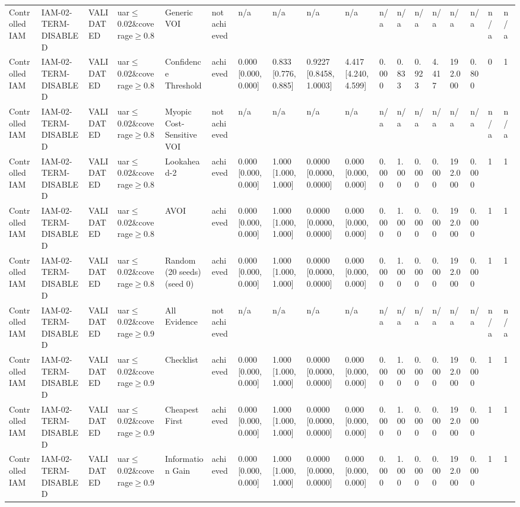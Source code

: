 \begin{table}[!ht]
{\begin{tabular}{llllllllllllllllll}
Controlled IAM & IAM-02-TERM-DISABLED & VALIDATED & uar$\le$0.02\&coverage$\ge$0.8 & Generic VOI & not achieved & n/a & n/a & n/a & n/a & n/a & n/a & n/a & n/a & n/a & n/a & n/a & n/a \\
Controlled IAM & IAM-02-TERM-DISABLED & VALIDATED & uar$\le$0.02\&coverage$\ge$0.8 & Confidence Threshold & achieved & 0.000 [0.000, 0.000] & 0.833 [0.776, 0.885] & 0.9227 [0.8458, 1.0003] & 4.417 [4.240, 4.599] & 0.000 & 0.833 & 0.923 & 4.417 & 192.000 & 0.800 & 0 & 1 \\
Controlled IAM & IAM-02-TERM-DISABLED & VALIDATED & uar$\le$0.02\&coverage$\ge$0.8 & Myopic Cost-Sensitive VOI & not achieved & n/a & n/a & n/a & n/a & n/a & n/a & n/a & n/a & n/a & n/a & n/a & n/a \\
Controlled IAM & IAM-02-TERM-DISABLED & VALIDATED & uar$\le$0.02\&coverage$\ge$0.8 & Lookahead-2 & achieved & 0.000 [0.000, 0.000] & 1.000 [1.000, 1.000] & 0.0000 [0.0000, 0.0000] & 0.000 [0.000, 0.000] & 0.000 & 1.000 & 0.000 & 0.000 & 192.000 & 0.000 & 1 & 1 \\
Controlled IAM & IAM-02-TERM-DISABLED & VALIDATED & uar$\le$0.02\&coverage$\ge$0.8 & AVOI & achieved & 0.000 [0.000, 0.000] & 1.000 [1.000, 1.000] & 0.0000 [0.0000, 0.0000] & 0.000 [0.000, 0.000] & 0.000 & 1.000 & 0.000 & 0.000 & 192.000 & 0.000 & 1 & 1 \\
Controlled IAM & IAM-02-TERM-DISABLED & VALIDATED & uar$\le$0.02\&coverage$\ge$0.8 & Random (20 seeds) (seed 0) & achieved & 0.000 [0.000, 0.000] & 1.000 [1.000, 1.000] & 0.0000 [0.0000, 0.0000] & 0.000 [0.000, 0.000] & 0.000 & 1.000 & 0.000 & 0.000 & 192.000 & 0.000 & 1 & 1 \\
Controlled IAM & IAM-02-TERM-DISABLED & VALIDATED & uar$\le$0.02\&coverage$\ge$0.9 & All Evidence & not achieved & n/a & n/a & n/a & n/a & n/a & n/a & n/a & n/a & n/a & n/a & n/a & n/a \\
Controlled IAM & IAM-02-TERM-DISABLED & VALIDATED & uar$\le$0.02\&coverage$\ge$0.9 & Checklist & achieved & 0.000 [0.000, 0.000] & 1.000 [1.000, 1.000] & 0.0000 [0.0000, 0.0000] & 0.000 [0.000, 0.000] & 0.000 & 1.000 & 0.000 & 0.000 & 192.000 & 0.000 & 1 & 1 \\
Controlled IAM & IAM-02-TERM-DISABLED & VALIDATED & uar$\le$0.02\&coverage$\ge$0.9 & Cheapest First & achieved & 0.000 [0.000, 0.000] & 1.000 [1.000, 1.000] & 0.0000 [0.0000, 0.0000] & 0.000 [0.000, 0.000] & 0.000 & 1.000 & 0.000 & 0.000 & 192.000 & 0.000 & 1 & 1 \\
Controlled IAM & IAM-02-TERM-DISABLED & VALIDATED & uar$\le$0.02\&coverage$\ge$0.9 & Information Gain & achieved & 0.000 [0.000, 0.000] & 1.000 [1.000, 1.000] & 0.0000 [0.0000, 0.0000] & 0.000 [0.000, 0.000] & 0.000 & 1.000 & 0.000 & 0.000 & 192.000 & 0.000 & 1 & 1 \\

\end{tabular}}
\end{table}
